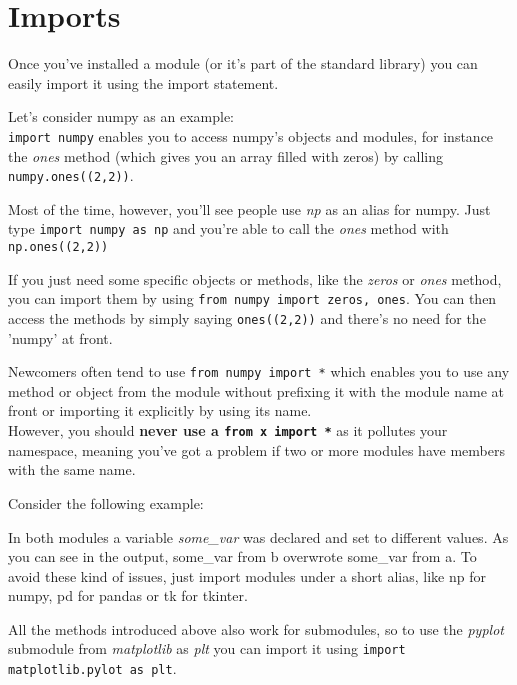 \section{Imports}

  Once you've installed a module (or it's part of the standard library) you can
  easily import it using the import statement.

  Let's consider numpy as an example:\\
  \texttt{import numpy} enables you to access numpy's objects and modules, 
  for instance the \textit{ones} method (which gives you an array filled with zeros)
  by calling \texttt{numpy.ones((2,2))}.

  Most of the time, however, you'll see people use \textit{np} as an alias for numpy.
  Just type \texttt{import numpy as np} and you're able to call the
  \textit{ones} method with \texttt{np.ones((2,2))}

  If you just need some specific objects or methods, like the \textit{zeros} or \textit{ones} method,
  you can import them by using \texttt{from numpy import zeros, ones}.
  You can then access the methods by simply saying
  \texttt{ones((2,2))} and there's no need for the 'numpy' at front.

  Newcomers often tend to use \texttt{from numpy import *} which
  enables you to use any method or object from the module without prefixing
  it with the module name at front or importing it explicitly by using its name.\\
  However, you should \textbf{never use a \texttt{from x import *}}
  as it pollutes your namespace, meaning you've got a problem if
  two or more modules have members with the same name.

  Consider the following example:

  In both modules a variable \textit{some\_var} was declared and set to different values.
  As you can see in the output, some\_var from b overwrote some\_var from a.
  To avoid these kind of issues, just import modules under a short alias, like
  np for numpy, pd for pandas or tk for tkinter.

  All the methods introduced above also work for submodules, so to use the \textit{pyplot} submodule
  from \textit{matplotlib} as \textit{plt} you can import it using
  \texttt{import matplotlib.pylot as plt}.